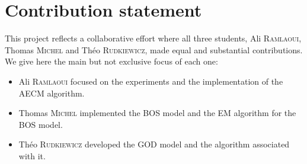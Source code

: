 \section{Contribution statement}
This project reflects a collaborative effort where all three students, Ali \textsc{Ramlaoui}, Thomas \textsc{Michel} and Théo \textsc{Rudkiewicz}, made equal and substantial contributions. 
We give here the main but not exclusive focus of each one:
\begin{itemize}
    \item Ali \textsc{Ramlaoui} focused on the experiments and the implementation of the AECM algorithm.
    \item Thomas \textsc{Michel} implemented the BOS model and the EM algorithm for the BOS model.
    \item Théo \textsc{Rudkiewicz} developed the GOD model and the algorithm associated with it.
\end{itemize}